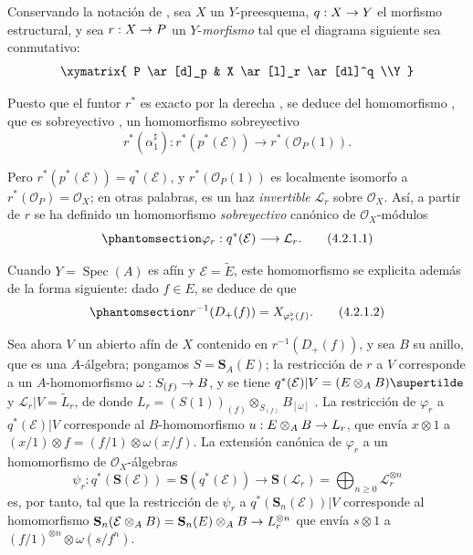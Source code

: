 \documentclass[oneside,10pt]{amsart}
\makeatletter
\renewcommand{\geq}{\geqslant}
\newcommand{\ega@arrow}[2]{\mathchoice{#1}{#2}{#2}{#2}}
\renewcommand{\to}{\ega@arrow{\longrightarrow}{\rightarrow}}
\newcommand{\oldpage}[2][]{\marginnote{\normalfont\footnotesize\textbf{#1}~|~#2}\ignorespaces}
\let\EGAOriginalLabel\label
\renewcommand{\label}[1]{\phantomsection\EGAOriginalLabel{#1}}
\makeatother
\begin{document}
\begin{env}[4.2.1]
\label{II.4.2.1-fr}
Conservando la notación de , sea $X$ un $Y$-preesquema, $q:X\to Y$ el morfismo estructural, y sea $r:X\to P$ un $Y$-\emph{morfismo} tal que el diagrama siguiente sea conmutativo:
\[
  \xymatrix{
    P \ar[d]_p & X \ar[l]_r \ar[dl]^q
    \\Y
  }
\]
\oldpage[II]{73}

Puesto que el funtor $r^*$ es exacto por la derecha , se deduce del homomorfismo , que es sobreyectivo , un homomorfismo sobreyectivo
\[
  r^*(\alpha_1^\sharp):r^*(p^*(\mathcal{E}))\longrightarrow
  r^*(\mathcal{O}_P(1)).
\]

Pero $r^*(p^*(\mathcal{E}))=q^*(\mathcal{E})$, y $r^*(\mathcal{O}_P(1))$ es localmente isomorfo a $r^*(\mathcal{O}_P)=\mathcal{O}_X$; en otras palabras, es un haz \emph{invertible} $\mathcal{L}_r$ sobre $\mathcal{O}_X$.
Así, a partir de $r$ se ha definido un homomorfismo \emph{sobreyectivo} canónico de $\mathcal{O}_X$-módulos
\[
\label{II.4.2.1.1-fr}
  \varphi_r:q^*(\mathcal{E})\longrightarrow\mathcal{L}_r.
\tag{4.2.1.1}
\]

Cuando $Y=\operatorname{Spec}(A)$ es afín y $\mathcal{E}=\widetilde{E}$, este homomorfismo se explicita además de la forma siguiente: dado $f\in E$, se deduce de  que
\[
\label{II.4.2.1.2-fr}
  r^{-1}(D_+(f))=X_{\varphi_r^\flat(f)}.
\tag{4.2.1.2}
\]

Sea ahora $V$ un abierto afín de $X$ contenido en $r^{-1}(D_+(f))$, y sea $B$ su anillo, que es una $A$-álgebra;
pongamos $S=\mathbf{S}_A(E)$;
la restricción de $r$ a $V$ corresponde a un $A$-homomorfismo $\omega:S_{(f)}\to B$, y se tiene $q^*(\mathcal{E})|V=(E\otimes_A B)\supertilde$ y $\mathcal{L}_r|V=\widetilde{L}_r$, de donde $L_r=(S(1))_{(f)}\otimes_{S_{(f)}}B_{[\omega]}$ .
La restricción de $\varphi_r$ a $q^*(\mathcal{E})|V$ corresponde al $B$-homomorfismo $u:E\otimes_A B\to L_r$, que envía $x\otimes1$ a $(x/1)\otimes f=(f/1)\otimes\omega(x/f)$.
La extensión canónica de $\varphi_r$ a un homomorfismo de $\mathcal{O}_X$-álgebras
\[
  \psi_r:q^*(\mathbf{S}(\mathcal{E}))=
  \mathbf{S}(q^*(\mathcal{E}))\longrightarrow
  \mathbf{S}(\mathcal{L}_r)=\bigoplus_{n\geq0}\mathcal{L}_r^{\otimes n}
\]
es, por tanto, tal que la restricción de $\psi_r$ a $q^*(\mathbf{S}_n(\mathcal{E}))|V$ corresponde al homomorfismo
$\mathbf{S}_n(\mathcal{E}\otimes_A B)=\mathbf{S}_n(E)\otimes_A B\to L_r^{\otimes n}$ que envía $s\otimes1$ a $(f/1)^{\otimes n}\otimes\omega(s/f^n)$.
\end{env}
\end{document}
